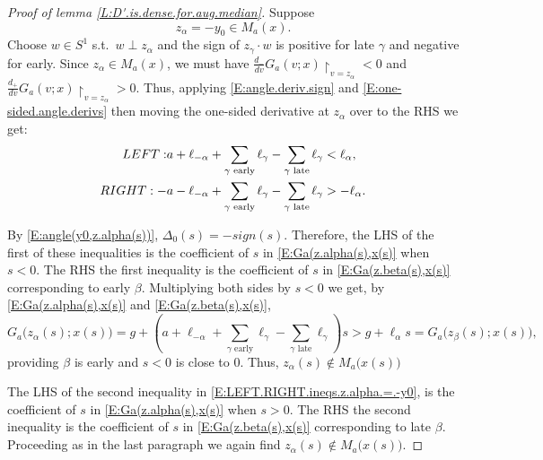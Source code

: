 \documentclass[10pt,a4paper]{amsart}
\begin{document}
\begin{proof}[Proof of lemma \ref{L:D'.is.dense.for.aug.median}]
Suppose
     \begin{equation*}
       z_{\alpha} = - y_{0} \in M_{a}(x) .
    \end{equation*}
Choose $w \in S^{1}$ s.t.\ $w \perp z_{\alpha}$ and the sign of $z_{\gamma} \cdot w$ is positive for late $\gamma$ and negative for early. Since $z_{\alpha} \in M_{a}(x)$, we must have 
$\tfrac{d_{-}}{dv} G_{a}(v;x) \restriction_{v=z_{\alpha}} < 0$ and 
$\tfrac{d_{+}}{dv} G_{a}(v;x)  \restriction_{v=z_{\alpha}} > 0$. Thus, applying \eqref{E:angle.deriv.sign} and \eqref{E:one-sided.angle.derivs} then moving the one-sided derivative at $z_{\alpha}$ over to the RHS we get:
    \begin{align}  \label{E:LEFT.RIGHT.ineqs.z.alpha.=.-y0}
       \emph{LEFT: } &a + \ell_{-\alpha} 
         + \sum_{\gamma \text{ early}} \ell_{\gamma} 
                  - \sum_{\gamma \text{ late}} \ell_{\gamma} < \ell_{\alpha} , \\
       \emph{RIGHT: }  -&a - \ell_{-\alpha} 
         + \sum_{\gamma \text{ early}} \ell_{\gamma} 
                  - \sum_{\gamma \text{ late}} \ell_{\gamma} > - \ell_{\alpha} \notag .
    \end{align}

By \eqref{E:angle(y0,z.alpha(s))}, $\Delta_{0}(s)= - sign(s)$. Therefore, the LHS of the first of these inequalities is the coefficient 
of $s$ in \eqref{E:Ga(z.alpha(s),x(s)} when $s < 0$. The RHS the first inequality is the coefficient of $s$ in \eqref{E:Ga(z.beta(s),x(s)} corresponding to early $\beta$. Multiplying both sides 
by $s < 0$ we get, by \eqref{E:Ga(z.alpha(s),x(s)} and \eqref{E:Ga(z.beta(s),x(s)},
    \begin{equation*}
      G_{a} \bigl( z_{\alpha}(s); x(s) \bigr) 
        = g + \left( a + \ell_{-\alpha} + \sum_{\gamma \text{ early}} \ell_{\gamma} 
          - \sum_{\gamma \text{ late}} \ell_{\gamma} \right) s
            > g + \ell_{\alpha} s = G_{a} \bigl( z_{\beta}(s); x(s) \bigr),
    \end{equation*}
providing $\beta$ is early and $s < 0$ is close to 0. 
Thus, $z_{\alpha}(s) \notin M_{a} \bigl( x(s) \bigr)$

The LHS of the second inequality in \eqref{E:LEFT.RIGHT.ineqs.z.alpha.=.-y0}, is the coefficient of $s$ in \eqref{E:Ga(z.alpha(s),x(s)} when $s > 0$. The RHS the second inequality is the coefficient of $s$ in \eqref{E:Ga(z.beta(s),x(s)} corresponding to late $\beta$. Proceeding as in the last paragraph we again find $z_{\alpha}(s) \notin M_{a} \bigl( x(s) \bigr)$.


\end{proof}
\end{document}
